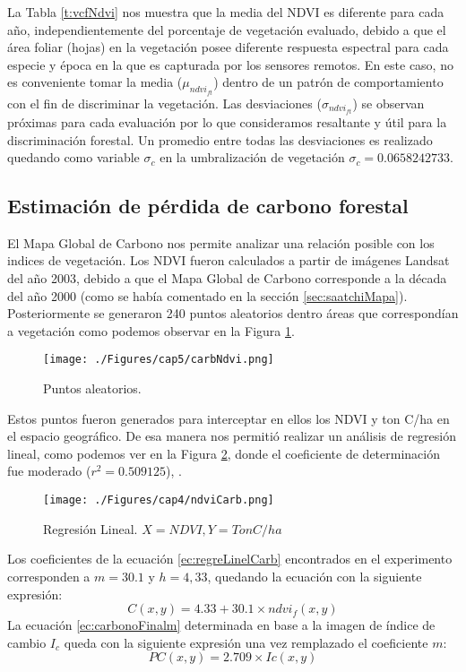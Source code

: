 La Tabla \ref{t:vcfNdvi} nos muestra que la media del NDVI es diferente para cada a\~{n}o, independientemente del porcentaje de vegetaci\'on evaluado, debido a que el \'area foliar (hojas) en la vegetaci\'on posee diferente respuesta espectral para cada especie y \'epoca en la que es capturada por los sensores remotos. En este caso, no es conveniente tomar la media ($  \mu_{ndvi_{ft}} $) dentro de un patr\'on de comportamiento con el fin de discriminar la vegetaci\'on. Las desviaciones ($ \sigma_{ndvi_{ft}} $) se observan pr\'oximas para cada evaluaci\'on por lo que consideramos resaltante y \'util para la discriminaci\'on forestal. Un promedio entre todas las desviaciones es realizado quedando como variable $ \sigma_{c} $ en la umbralizaci\'on de vegetaci\'on  $ \sigma_{c} = 0.0658242733 $.
\subsection{Estimaci\'on de p\'erdida de carbono forestal}\label{subsec:estimacionCarbono}
El Mapa Global de Carbono nos permite analizar una relaci\'on posible con los indices de vegetaci\'on. Los NDVI fueron calculados a partir de im\'agenes Landsat del a\~{n}o 2003, debido a que el Mapa Global de Carbono corresponde a la d\'ecada del a\~{n}o 2000 (como se hab\'ia comentado en la secci\'on \ref{sec:saatchiMapa}). Posteriormente se generaron 240 puntos aleatorios dentro \'areas que correspond\'ian a vegetaci\'on como podemos observar en la Figura \ref{fig:aleatorioCrb}.
\begin{figure}[H]
	\centering
	\texttt{[image: ./Figures/cap5/carbNdvi.png]}
	\caption{Puntos aleatorios.}
	\label{fig:aleatorioCrb}
\end{figure}
Estos puntos fueron generados para interceptar en ellos los NDVI y ton C/ha en el espacio geográfico. De esa manera nos permiti\'o realizar un an\'alisis de regresi\'on lineal, como podemos ver en la Figura \ref{fig:linealCar}, donde el coeficiente de determinaci\'on fue moderado ($ r^{2}=0.509125 $), .
\begin{figure}[H]
	\centering
	\texttt{[image: ./Figures/cap4/ndviCarb.png]}
	\caption{Regresi\'on Lineal. $ X=NDVI, Y=TonC/ha $}
	\label{fig:linealCar}
\end{figure}
Los coeficientes de la ecuaci\'on \ref{ec:regreLinelCarb} encontrados en el experimento corresponden a $ m=30.1 $ y $ h =4,33 $, quedando la ecuaci\'on con la siguiente expresi\'on:
\begin{equation}\label{ec:regreLinelCarbExp}
C(x,y)=4.33+30.1 \times ndvi_{f}(x,y)
\end{equation}
La ecuaci\'on \ref{ec:carbonoFinalm} determinada en base a la imagen de \'indice de cambio $ I_{c} $ queda con la siguiente expresi\'on una vez remplazado el coeficiente $ m $:
 \begin{equation}\label{ec:carbonoFinalmExp}
 PC(x,y) = 2.709 \times Ic(x,y)
 \end{equation}


